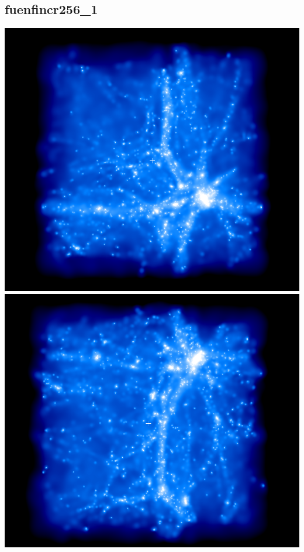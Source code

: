 \newpage
\subsection{fuenfincr256\_1}

\includegraphics[scale=0.2]{fuenfincr256_1/1.png} 
\includegraphics[scale=0.2]{fuenfincr256_1/2.png}

